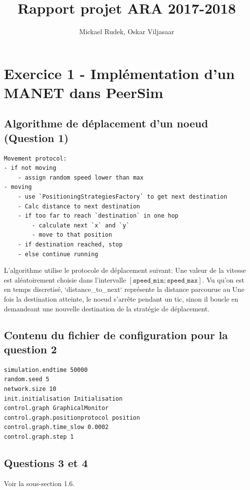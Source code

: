 \documentclass[a4paper]{article}
\title{Rapport projet ARA 2017-2018}
\author{Mickael Rudek, Oskar Viljasaar}
\begin{document}
\maketitle


\tableofcontents

\section{Exercice 1 - Implémentation d'un MANET dans PeerSim}
\subsection{Algorithme de déplacement d'un noeud (Question 1)}

\begin{verbatim}
Movement protocol:
- if not moving
    - assign random speed lower than max
- moving
    - use `PositioningStrategiesFactory` to get next destination
    - Calc distance to next destination
    - if too far to reach `destination` in one hop
        - calculate next `x` and `y`
        - move to that position
    - if destination reached, stop
    - else continue running
\end{verbatim}
L'algorithme utilise le protocole de déplacement suivant:
Une valeur de la vitesse est aléatoirement choisie dans l'intervalle
$ \left[ \texttt{speed\_min}; \texttt{speed\_max} \right] $.
Vu qu'on est en temps discretisé, `distance\_to\_next` représente la distance parcourue au
 Une fois la destination atteinte, le noeud s'arrête pendant un tic,
 sinon il boucle en demandeant une nouvelle destination de la
 stratégie de déplacement.


 \subsection{Contenu du fichier de configuration pour la question 2}

\begin{verbatim}
simulation.endtime 50000
random.seed 5
network.size 10
init.initialisation Initialisation
control.graph GraphicalMonitor
control.graph.positionprotocol position
control.graph.time_slow 0.0002
control.graph.step 1
\end{verbatim}

\subsection{Questions 3 et 4}
Voir la sous-section 1.6.
\end{document}
